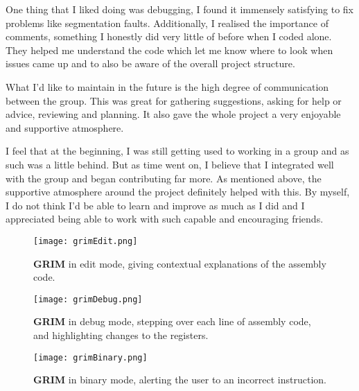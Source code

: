 \documentclass{ictex}
\begin{document}
One thing that I liked doing was debugging, I found it immensely satisfying to fix problems like segmentation faults. Additionally, I realised the importance of comments, something I honestly did very little of before when I coded alone. They helped me understand the code which let me know where to look when issues came up and to also be aware of the overall project structure.

What I’d like to maintain in the future is the high degree of communication between the group. This was great for gathering suggestions, asking for help or advice, reviewing and planning. It also gave the whole project a very enjoyable and supportive atmosphere.

I feel that at the beginning, I was still getting used to working in a group and as such was a little behind. But as time went on, I believe that I integrated well with the group and began contributing far more. As mentioned above, the supportive atmosphere around the project definitely helped with this. By myself, I do not think I’d be able to learn and improve as much as I did and I appreciated being able to work with such capable and encouraging friends.

\newpage

\begin{figure*}[h!]
    \centering
    \texttt{[image: grimEdit.png]}
    \caption{\textbf{GRIM} in edit mode, giving contextual explanations of the assembly code.}
    \label{fig:grimEdit}
\end{figure*}

\begin{figure*}[h!]
    \centering
    \texttt{[image: grimDebug.png]}
    \caption{\textbf{GRIM} in debug mode, stepping over each line of assembly code, and highlighting changes to the registers.}
    \label{fig:grimDebug}
\end{figure*}

\begin{figure*}[h!]
    \centering
    \texttt{[image: grimBinary.png]}
    \caption{\textbf{GRIM} in binary mode, alerting the user to an incorrect instruction.}
    \label{fig:grimBinary}
\end{figure*}
\end{document}

